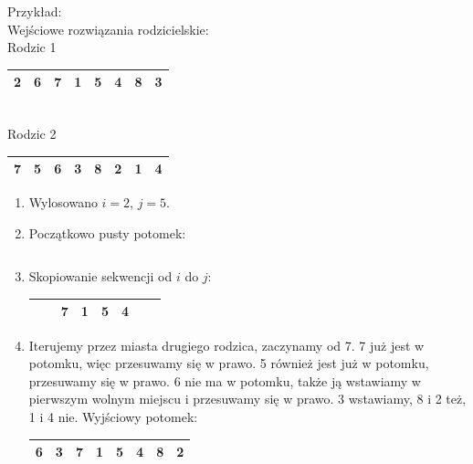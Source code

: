 \documentclass[12pt, a4paper]{article}
\begin{document}
Przykład: \\

Wejściowe rozwiązania rodzicielskie: \\

Rodzic 1
\begin{tabular}{ | c | c | c | c | c | c | c | c |}
  \hline
  2 & 6 &  \cellcolor{green!25}7 & \cellcolor{green!25}1 & \cellcolor{green!25}5 & \cellcolor{green!25}4 & 8 & 3 \\ \hline
\end{tabular}\\
Rodzic 2
\begin{tabular}{ | c | c | c | c | c | c | c | c |}
  \hline
  7 & 5 & 6 & 3 & 8 & 2 & 1 & 4 \\ \hline
\end{tabular}

\begin{enumerate}
 \item Wylosowano $i = 2$, $j = 5$.

 \item Początkowo pusty potomek:
\begin{tabular}{ | c | c | c | c | c | c | c | c |}
 \hline
   &  &  &  &  &  &  &  \\ \hline
\end{tabular}

 \item Skopiowanie sekwencji od $i$ do $j$:
\begin{tabular}{ | c | c | c | c | c | c | c | c |}
 \hline
   &  &  \cellcolor{green!25}7 & \cellcolor{green!25}1 & \cellcolor{green!25}5 & \cellcolor{green!25}4 &  &  \\ \hline
\end{tabular}

 \item Iterujemy przez miasta drugiego rodzica, zaczynamy od 7. 7 już jest w potomku, więc przesuwamy się w prawo.
5 również jest już w potomku, przesuwamy się w prawo. 6 nie ma w potomku, także ją wstawiamy w pierwszym wolnym miejscu
i przesuwamy się w prawo. 3 wstawiamy, 8 i 2 też, 1 i 4 nie. Wyjściowy potomek:

\begin{tabular}{ | c | c | c | c | c | c | c | c |}
 \hline
  6 & 3 &  \cellcolor{green!25}7 & \cellcolor{green!25}1 & \cellcolor{green!25}5 & \cellcolor{green!25}4 & 8 & 2 \\ \hline
\end{tabular}\\

\end{enumerate}
\end{document}
